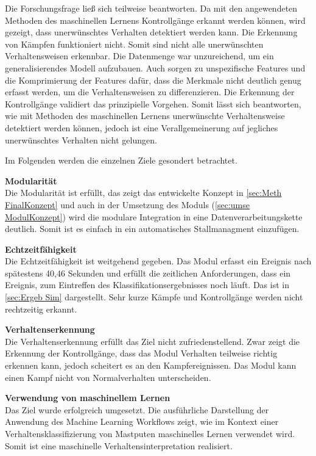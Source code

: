 Die Forschungsfrage ließ sich teilweise beantworten. Da mit den angewendeten Methoden des maschinellen Lernens Kontrollgänge erkannt werden können, wird gezeigt, dass unerwünschtes Verhalten detektiert werden kann. Die Erkennung von Kämpfen funktioniert nicht. Somit sind nicht alle unerwünschten Verhaltensweisen erkennbar. Die Datenmenge war unzureichend, um ein generalisierendes Modell aufzubauen. Auch sorgen zu unspezifische Features und die Komprimierung der Features dafür, dass die Merkmale nicht deutlich genug erfasst werden, um die Verhaltensweisen zu differenzieren. Die Erkennung der Kontrollgänge validiert das prinzipielle Vorgehen. Somit lässt sich beantworten, wie mit Methoden des maschinellen Lernens unerwünschte Verhaltensweise detektiert werden können, jedoch ist eine Verallgemeinerung auf jegliches unerwünschtes Verhalten nicht gelungen.\par

Im Folgenden werden die einzelnen Ziele gesondert betrachtet.

\textbf{Modularität}\\
Die Modularität ist erfüllt, das zeigt das entwickelte Konzept in \autoref{sec:Meth FinalKonzept} und auch in der Umsetzung des Moduls (\autoref{sec:umse ModulKonzept}) wird die modulare Integration in eine Datenverarbeitungskette deutlich. Somit ist es einfach in ein automatisches Stallmanagment einzufügen.\par

\textbf{Echtzeitfähigkeit}\\
Die Echtzeitfähigkeit ist weitgehend gegeben. Das Modul erfasst ein Ereignis nach spätestens 40,46 Sekunden und erfüllt die zeitlichen Anforderungen, dass ein Ereignis, zum Eintreffen des Klassifikationsergebnisses noch läuft. Das ist in \autoref{sec:Ergeb Sim} dargestellt. Sehr kurze Kämpfe und Kontrollgänge werden nicht rechtzeitig erkannt.\par

\textbf{Verhaltenserkennung}\\
Die Verhaltenserkennung erfüllt das Ziel nicht zufriedenstellend. Zwar zeigt die Erkennung der Kontrollgänge, dass das Modul Verhalten teilweise richtig erkennen kann, jedoch scheitert es an den Kampfereignissen. Das Modul kann einen Kampf nicht von Normalverhalten unterscheiden. \par

\textbf{Verwendung von maschinellem Lernen}\\
Das Ziel wurde erfolgreich umgesetzt. Die ausführliche Darstellung der Anwendung des Machine Learning Workflows zeigt, wie im Kontext einer Verhaltensklassifizierung von Mastputen maschinelles Lernen verwendet wird. Somit ist eine maschinelle Verhaltensinterpretation realisiert. \par

